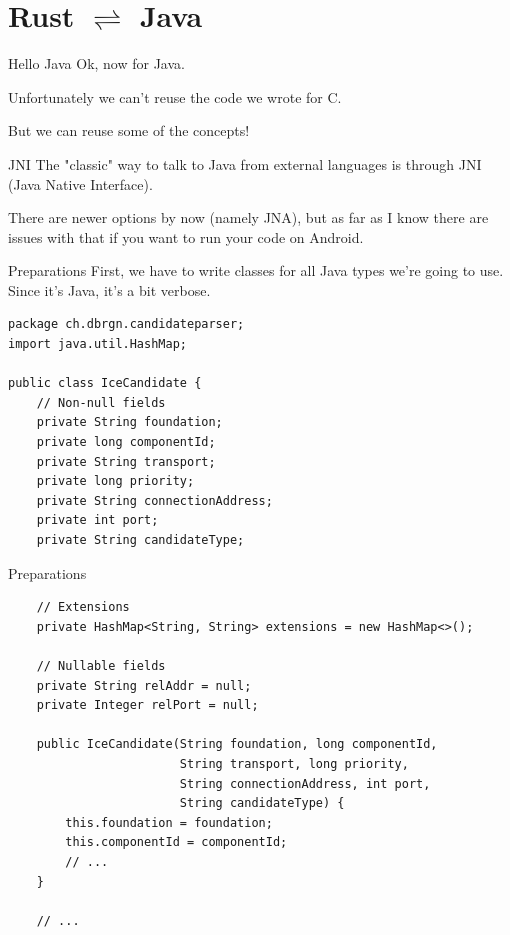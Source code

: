 \documentclass[aspectratio=1610,14pt,t]{beamer}
\begin{document}

\section{Rust $\rightleftharpoons$ Java}

\begin{frame}[c]{Hello Java}
  Ok, now for Java.

  Unfortunately we can't reuse the code we wrote for C.

  But we can reuse some of the concepts!
\end{frame}

\begin{frame}[c]{JNI}
  The "classic" way to talk to Java from external languages is through JNI (Java
  Native Interface).

  There are newer options by now (namely JNA), but as far as I know there are
  issues with that if you want to run your code on Android.
\end{frame}

\begin{frame}[c,fragile]{Preparations}
  First, we have to write classes for all Java types we're going to use. Since
  it's Java, it's a bit verbose.

  \begin{verbatim}
package ch.dbrgn.candidateparser;
import java.util.HashMap;

public class IceCandidate {
    // Non-null fields
    private String foundation;
    private long componentId;
    private String transport;
    private long priority;
    private String connectionAddress;
    private int port;
    private String candidateType;
  \end{verbatim}
\end{frame}

\begin{frame}[c,fragile]{Preparations}
  \begin{verbatim}
    // Extensions
    private HashMap<String, String> extensions = new HashMap<>();

    // Nullable fields
    private String relAddr = null;
    private Integer relPort = null;

    public IceCandidate(String foundation, long componentId,
                        String transport, long priority,
                        String connectionAddress, int port,
                        String candidateType) {
        this.foundation = foundation;
        this.componentId = componentId;
        // ...
    }

    // ...
  \end{verbatim}
\end{frame}
\end{document}
